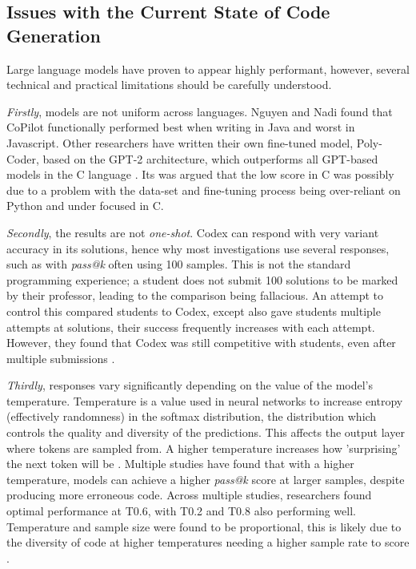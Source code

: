 \documentclass[manuscript,screen,review,sigconf]{acmart}
\begin{document}
\subsection{Issues with the Current State of Code Generation}
 Large language models have proven to appear highly performant, however, several technical and practical limitations should be carefully understood.

\textit{Firstly}, models are not uniform across languages. Nguyen and Nadi \cite{CopilotSuggestionsEval} found that CoPilot functionally performed best when writing in Java and worst in Javascript. Other researchers have written their own fine-tuned model, Poly-Coder, based on the GPT-2 architecture, which outperforms all GPT-based models in the C language \cite{SysEvaOfLLMofCode}. Its was argued that the low score in C was possibly due to a problem with the data-set and fine-tuning process being over-reliant on Python and under focused in C.

\textit{Secondly}, the results are not \textit{one-shot}. Codex can respond with very variant accuracy in its solutions, hence why most investigations use several responses, such as with \textit{pass@k} often using 100 samples. This is not the standard programming experience; a student does not submit 100 solutions to be marked by their professor, leading to the comparison being fallacious. An attempt to control this compared students to Codex, except also gave students multiple attempts at solutions, their success frequently increases with each attempt. However, they found that Codex was still competitive with students, even after multiple submissions \cite{Codex_CS1_CS2_Test}.

\textit{Thirdly}, responses vary significantly depending on the value of the model's temperature. Temperature is a value used in neural networks to increase entropy (effectively randomness) in the softmax distribution, the distribution which controls the quality and diversity of the predictions. This affects the output layer where tokens are sampled from. A higher temperature increases how 'surprising' the next token will be \cite{temperatureSoftMaxhinton2015distilling, temperaturewang2020contextual}. Multiple studies have found that with a higher temperature, models can achieve a higher \textit{pass@k} score at larger samples, despite producing more erroneous code. Across multiple studies, researchers found optimal performance at T0.6, with T0.2 and T0.8 also performing well. Temperature and sample size were found to be proportional, this is likely due to the diversity of code at higher temperatures needing a higher sample rate to score \cite{stackOVerflowAndTemperature, SysEvaOfLLMofCode, CodexRelPaper}.
\end{document}
